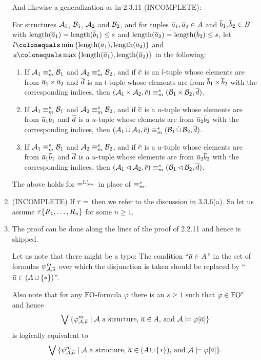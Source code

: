 \begin{enumerate}[1.]
And likewise a generalization as in 2.3.11 (INCOMPLETE):
\begin{conjecture}
For structures $\mathcal{A}_1$, $\mathcal{B}_1$, $\mathcal{A}_2$ and $\mathcal{B}_2$, and for tuples $\overline{a}_1, \overline{a}_2 \in A$ and $\overline{b}_1, \overline{b}_2 \in B$ with $\mathrm{length}(\overline{a}_1) = \mathrm{length}(\overline{b}_1) \leq s$ and $\mathrm{length}(\overline{a}_2) = \mathrm{length}(\overline{b}_2) \leq s$, let $l \defas \min\sete{\length(\vect{a}_1), \length(\vect{a}_2)}$ and $u \defas \max\sete{\length(\vect{a}_1), \length(\vect{a}_2)}$ in the following:
\begin{enumerate}[\rm(a)]
\item If $\mathcal{A}_1 \equiv^s_m \mathcal{B}_1$ and $\mathcal{A}_2 \equiv^s_m \mathcal{B}_2$, and if $\overline{c}$ is an $l$-tuple whose elements are from $\overline{a}_1 \mathop{\times} \overline{a}_2$ and $\overline{d}$ is an $l$-tuple whose elements are from $\overline{b}_1 \mathop{\times} \overline{b}_2$ with the corresponding indices, then $(\mathcal{A}_1 \mathop{\times} \mathcal{A}_2, \overline{c}) \equiv^s_m (\mathcal{B}_1 \mathop{\times} \mathcal{B}_2, \overline{d})$.
\item If $\mathcal{A}_1 \equiv^s_m \mathcal{B}_1$ and $\mathcal{A}_2 \equiv^s_m \mathcal{B}_2$, and if $\overline{c}$ is a $u$-tuple whose elements are from $\overline{a}_1\overline{b}_1$ and $\overline{d}$ is a $u$-tuple whose elements are from $\overline{a}_2\overline{b}_2$ with the corresponding indices, then $(\mathcal{A}_1 \mathop{\dot{\cup}} \mathcal{A}_2, \overline{c}) \equiv^s_m (\mathcal{B}_1 \mathop{\dot{\cup}} \mathcal{B}_2, \overline{d})$.
\item If $\mathcal{A}_1 \equiv^s_m \mathcal{B}_1$ and $\mathcal{A}_2 \equiv^s_m \mathcal{B}_2$, and if $\overline{c}$ is a $u$-tuple whose elements are from $\overline{a}_1\overline{b}_1$ and $\overline{d}$ is a $u$-tuple whose elements are from $\overline{a}_2\overline{b}_2$ with the corresponding indices, then $(\mathcal{A}_1 \mathop{\lhd} \mathcal{A}_2, \overline{c}) \equiv^s_m (\mathcal{B}_1 \mathop{\lhd} \mathcal{B}_2, \overline{d})$.
\end{enumerate}
The above holds for $\equv^{\inflog[s]}$ in place of $\equiv^s_m$.
\end{conjecture}
%
\item {} (INCOMPLETE) If $\tau = \empty$ then we refer to the discussion in 3.3.6(a). So let us assume $\tau {\{R_1, \ldots, R_n\}}$ for some $n \geq 1$.
%
\item {} The proof can be done along the lines of the proof of 2.2.11 and hence is skipped.

Let us note that there might be a typo: The condition ``$\overline{a} \in A$'' in the set of formulas $\ityp{m}{\strct{A}, \vect{a}}$ over which the disjunction is taken should be replaced by ``$\overline{a} \in (A \mathop{\cup} {\{\ast\}})$''.

Also note that for any $\folog$-formula $\varphi$ there is an $s \geq 1$ such that $\varphi \in \folog^s$ and hence
\[
\blor \sett{\hint{m}{\strct{A}, \vect{a}}}{\mathmode{\strct{A}} a structure, \mathmode{\vect{a} \in A}, and \mathmode{\strct{A} \satis \varphi[\vect{a}]}}
\]
is logically equivalent to
\[
\blor \sett{\ityp{m}{\strct{A}, \vect{a}}}{\mathmode{\strct{A}} a structure, \mathmode{\vect{a} \in (A \union \sete{\off})}, and \mathmode{\strct{A} \satis \varphi[\vect{a}]}}.
\]
%
\end{enumerate}
